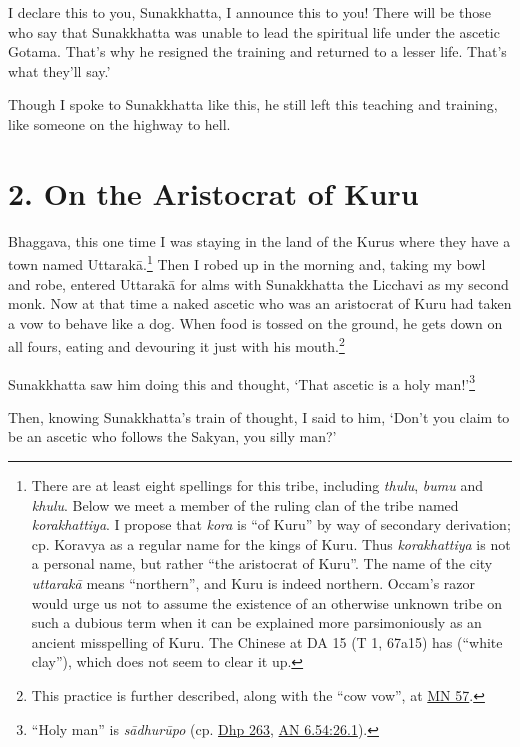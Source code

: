 \documentclass[12pt,openany]{book}%
\newcommand*{\langlzh}[1]{\cjk{#1}\normalfont}%
\begin{document}
I declare this to you, Sunakkhatta, I announce this to you! There will be those who say that Sunakkhatta was unable to lead the spiritual life under the ascetic Gotama. That’s why he resigned the training and returned to a lesser life. That’s what they’ll say.’ 

Though I spoke to Sunakkhatta like this, he still left this teaching and training, like someone on the highway to hell. 

\section*{2. On the Aristocrat of Kuru }

Bhaggava, this one time I was staying in the land of the Kurus where they have a town named \textsanskrit{Uttarakā}.\footnote{There are at least eight spellings for this tribe, including \textit{thulu}, \textit{bumu} and \textit{khulu}. Below we meet a member of the ruling clan of the tribe named \textit{korakhattiya}. I propose that \textit{kora} is “of Kuru” by way of secondary derivation; cp. Koravya as a regular name for the kings of Kuru. Thus \textit{korakhattiya} is not a personal name, but rather “the aristocrat of Kuru”. The name of the city \textit{\textsanskrit{uttarakā}} means “northern”, and Kuru is indeed northern. Occam’s razor would urge us not to assume the existence of an otherwise unknown tribe on such a dubious term when it can be explained more parsimoniously as an ancient misspelling of Kuru. The Chinese at DA 15 (T 1, 67a15) has \langlzh{白土} (“white clay”), which does not seem to clear it up. } Then I robed up in the morning and, taking my bowl and robe, entered \textsanskrit{Uttarakā} for alms with Sunakkhatta the Licchavi as my second monk. Now at that time a naked ascetic who was an aristocrat of Kuru had taken a vow to behave like a dog. When food is tossed on the ground, he gets down on all fours, eating and devouring it just with his mouth.\footnote{This practice is further described, along with the “cow vow”, at \href{https://suttacentral.net/mn57/en/sujato}{MN 57}. } 

Sunakkhatta saw him doing this and thought, ‘That ascetic is a holy man!’\footnote{“Holy man” is \textit{\textsanskrit{sādhurūpo}} (cp. \href{https://suttacentral.net/dhp263/en/sujato}{Dhp 263}, \href{https://suttacentral.net/an6.54/en/sujato\#26.1}{AN 6.54:26.1}). } 

Then, knowing Sunakkhatta’s train of thought, I said to him, ‘Don’t you claim to be an ascetic who follows the Sakyan, you silly man?’ 
\end{document}
